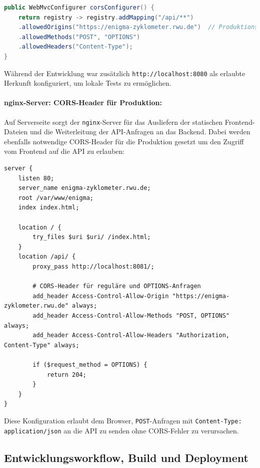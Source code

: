\documentclass[12pt, ngerman, a4paper, numbers=noenddot]{article}
\begin{document}
\begin{lstlisting}[language=Java, caption=Spring Boot CORS-Konfiguration]
public WebMvcConfigurer corsConfigurer() {
	return registry -> registry.addMapping("/api/**")
	.allowedOrigins("https://enigma-zyklometer.rwu.de")  // Produktionsdomain
	.allowedMethods("POST", "OPTIONS")
	.allowedHeaders("Content-Type");
}
\end{lstlisting}

Während der Entwicklung war zusätzlich \lstinline|http://localhost:8080| als erlaubte Herkunft konfiguriert, um lokale Tests zu ermöglichen.


\paragraph{nginx-Server: CORS-Header für Produktion:}

Auf Serverseite sorgt der \lstinline|nginx|\newline -Server für das Ausliefern der statischen Frontend-Dateien und die Weiterleitung der API-Anfragen an das Backend. Dabei werden ebenfalls notwendige CORS-Header für die Produktion gesetzt um den Zugriff vom Frontend auf die API zu erlauben:
\newpage
\begin{lstlisting}[language=nginx, caption=Konfiguration des \lstinline|nginx|-Servers]
server {
	listen 80;
	server_name enigma-zyklometer.rwu.de;
	root /var/www/enigma;
	index index.html;
	
	location / {
		try_files $uri $uri/ /index.html;
	}
	location /api/ {
		proxy_pass http://localhost:8081/;
		
		# CORS-Header für reguläre und OPTIONS-Anfragen
		add_header Access-Control-Allow-Origin "https://enigma-zyklometer.rwu.de" always;
		add_header Access-Control-Allow-Methods "POST, OPTIONS" always;
		add_header Access-Control-Allow-Headers "Authorization, Content-Type" always;
		
		if ($request_method = OPTIONS) {
			return 204;
		}
	}
}
\end{lstlisting}

Diese Konfiguration erlaubt dem Browser, \lstinline|POST|-Anfragen mit \newline\lstinline|Content-Type: application/json| an die API zu senden ohne CORS-Fehler zu verursachen.

\subsection{Entwicklungsworkflow, Build und Deployment}
\end{document}
